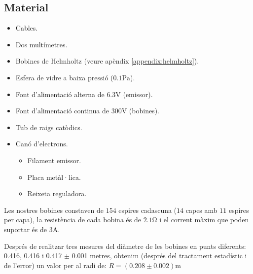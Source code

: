 \documentclass[11pt]{article}
\begin{document}
    \subsection{Material}
        \begin{multicols}{2}
            \begin{itemize}
                \item Cables.
                \item Dos multímetres.
                \item Bobines de Helmholtz (veure apèndix \ref{appendix:helmholtz}).
                \item Esfera de vidre a baixa pressió ($0.1\si{\pascal}$).
                \item Font d'alimentació alterna de $6.3\si{\volt}$ (emissor).
                \item Font d'alimentació continua de $300\si{\volt}$ (bobines).      
                \item Tub de raigs catòdics.
                \item Canó d'electrons.
                      \begin{itemize}
                          \item Filament emissor.
                          \item Placa metàl·lica.
                          \item Reixeta reguladora.
                      \end{itemize}
            \end{itemize}
        \end{multicols}

        Les nostres bobines constaven de $154$ espires cadascuna ($14$ capes amb $11$ espires per capa), la resistència de cada bobina és de $2.1\si{\ohm}$ i el corrent màxim que poden suportar és de $3\si{\ampere}$.

        \vspace{0.4cm}Després de realitzar tres mesures del diàmetre de les bobines en punts diferents: 0.416, 0.416 i 0.417 $\pm$ 0.001 metres, obtenim (després del tractament estadístic i de l'error) un valor per al radi de: $R = (0.208 \pm 0.002)\si{\meter}$
        
\end{document}
